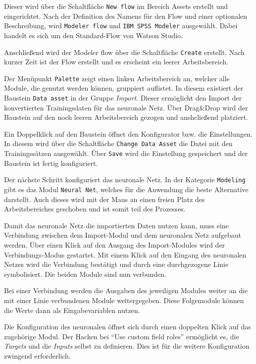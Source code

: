 Dieser wird über die Schaltfläche \texttt{New flow} im Bereich Assets erstellt und eingerichtet. Nach der Definition
des Namens für den Flow und einer optionalen Beschreibung, wird \texttt{Modeler flow} und \texttt{IBM SPSS Modeler}
ausgewählt. Dabei handelt es sich um den Standard-Flow von Watson Studio.

Anschließend wird der Modeler flow über die Schaltfläche \texttt{Create} erstellt. Nach kurzer Zeit ist der Flow erstellt
und es erscheint ein leerer Arbeitsbereich.

Der Menüpunkt \texttt{Palette} zeigt einen linken Arbeitsbereich an, welcher alle Module, die genutzt werden können,
gruppiert auflistet. In diesem existiert der Baustein \texttt{Data asset} in der Gruppe \textit{Import}. Dieser ermöglicht
den Import der konvertierten Trainingsdaten für das neuronale Netz. Über Drag\&Drop wird der Baustein auf den noch leeren
Arbeitsbereich gezogen und anshcließend platziert.

Ein Doppelklick auf den Baustein öffnet den Konfigurator bzw. die Einstellungen. In diesem wird über die Schaltfläche
\texttt{Change Data Asset} die Datei mit den Trainingssätzen ausgewählt. Über \texttt{Save} wird die Einstellung
gespeichert und der Baustein ist fertig konfiguriert.

Der nächste Schritt konfiguriert das neuronale Netz. In der Kategorie \texttt{Modeling} gibt es das Modul
\texttt{Neural Net}, welches für die Anwendung die beste Alternative darstellt. Auch dieses wird mit der Maus an einen
freien Platz des Arbeitsbereiches geschoben und ist somit teil des Prozesses.

Damit das neuronale Netz die importierten Daten nutzen kann, muss eine Verbindung zwischen dem Import-Modul und dem
neuronalen Netz aufgebaut werden. Über einen Klick auf den Ausgang des Import-Modules wird der Verbindungs-Modus gestartet.
Mit einem Klick auf den Eingang des neuronalen Netzes wird die Verbindung bestätigt und durch eine durchgezogene
Linie symbolisiert. Die beiden Module sind nun verbunden.

Bei einer Verbindung werden die Ausgaben des jeweiligen Modules weiter an die mit einer Linie verbundenen Module
weitergegeben. Diese Folgemodule können die Werte dann als Eingabevariablen nutzen.

Die Konfiguration des neuronalen öffnet sich durch einen doppelten Klick auf das zugehörige Modul. Der Hacken bei
\enquote{Use custom field roles} ermöglicht es, die \textit{Targets} und die \textit{Inputs} selbst zu definieren. Dies
ist für die weitere Konfiguration zwingend erforderlich.

